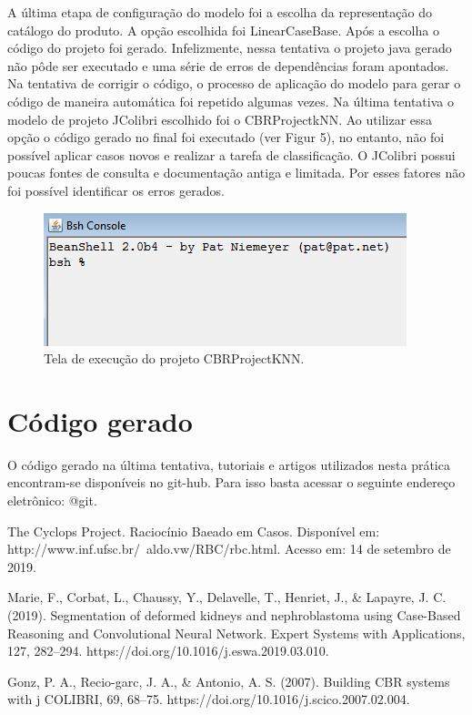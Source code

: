 \documentclass[conference]{IEEEtran}
\begin{document}
A última  etapa de configuração do modelo foi a escolha da representação do catálogo do produto. A opção escolhida foi LinearCaseBase. Após a escolha o código do projeto foi gerado. Infelizmente, nessa tentativa o projeto java gerado não pôde ser executado e uma série de erros de dependências foram apontados. Na tentativa de corrigir o código, o processo de aplicação do modelo para gerar o código de maneira automática foi repetido algumas vezes. Na última tentativa o modelo de projeto JColibri escolhido foi o CBRProjectkNN. Ao utilizar essa opção o código gerado no final foi executado (ver Figur 5), no entanto, não foi possível aplicar casos novos e realizar a tarefa de classificação. O JColibri possui poucas fontes de consulta e documentação antiga e limitada. Por esses fatores não foi possível identificar os erros gerados.

\begin{figure}[htbp]
	\centerline{\includegraphics{fig6.png}}
	\caption{Tela de execução do projeto CBRProjectKNN.}
	\label{fig5}
\end{figure}

\section*{Código gerado}

O código gerado na última tentativa, tutoriais e artigos utilizados nesta prática encontram-se disponíveis no git-hub. Para isso basta acessar o seguinte endereço eletrônico: @git.


\begin{thebibliography}{00}
	 The Cyclops Project. Raciocínio Baeado em Casos. Disponível em: http://www.inf.ufsc.br/~aldo.vw/RBC/rbc.html. Acesso em: 14 de setembro de 2019.
	
	  Marie, F., Corbat, L., Chaussy, Y., Delavelle, T., Henriet, J., \& Lapayre, J. C. (2019). Segmentation of deformed kidneys and nephroblastoma using Case-Based Reasoning and Convolutional Neural Network. Expert Systems with Applications, 127, 282–294. https://doi.org/10.1016/j.eswa.2019.03.010.
	
	  Gonz, P. A., Recio-garc, J. A., \& Antonio, A. S. (2007). Building CBR systems with j COLIBRI, 69, 68–75. https://doi.org/10.1016/j.scico.2007.02.004.
	
\end{thebibliography}
\end{document}
